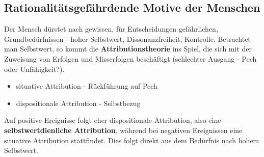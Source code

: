 \subsection{Rationalitätsgefährdende Motive der Menschen}
Der Mensch dürstet nach gewissen, für Entscheidungen gefährlichen,
Grundbedürfnissen - hoher Selbstwert, Dissonanzfreiheit, Kontrolle.
Betrachtet man Selbstwert, so kommt die \textbf{Attributionstheorie}
ins Spiel, die sich mit der Zuweisung von Erfolgen und Misserfolgen
beschäftigt (schlechter Ausgang - Pech oder Unfähigkeit?).
\begin{itemize}
    \item situative Attribution - Rückführung auf Pech
    \item dispositionale Attribution - Selbstbezug
\end{itemize}
Auf positive Ereignisse folgt eher dispositionale Attribution, also eine
\textbf{selbstwertdienliche Attribution}, während bei negativen
Ereignissen eine situative Attribution stattfindet. Dies folgt direkt
aus dem Bedürfnis nach hohem Selbstwert.
